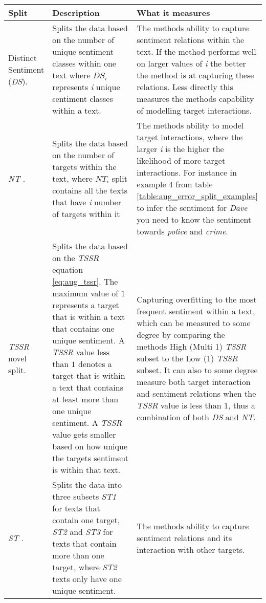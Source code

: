 \begin{longtable}{|p{0.15\linewidth}|p{0.45\linewidth}|p{0.4\linewidth}|}
\hline
Split & Description & What it measures \\
\hline
Distinct Sentiment (\textit{DS})\citep{wang-etal-2017-tdparse}. & Splits the data based on the number of unique sentiment classes within one text where $DS_i$ represents \textit{i} unique sentiment classes within a text. &  The methods ability to capture sentiment relations within the text. If the method performs well on larger values of \textit{i} the better the method is at capturing these relations. Less directly this measures the methods capability of modelling target interactions. \\
\hline
\textit{NT} \citep{zhang-etal-2019-aspect}. & Splits the data based on the number of targets within the text, where $NT_i$ split contains all the texts that have \textit{i} number of targets within it & The methods ability to model target interactions, where the larger \textit{i} is the higher the likelihood of more target interactions. For instance in example 4 from table \ref{table:aug_error_split_examples} to infer the sentiment for \textit{Dave} you need to know the sentiment towards \textit{police} and \textit{crime}.\\
\hline
\textit{TSSR} novel split. & Splits the data based on the \textit{TSSR} equation \ref{eq:aug_tssr}. The maximum value of $1$ represents a target that is within a text that contains one unique sentiment. A \textit{TSSR} value less than $1$ denotes a target that is within a text that contains at least more than one unique sentiment. A \textit{TSSR} value gets smaller based on how unique the targets sentiment is within that text. & Capturing overfitting to the most frequent sentiment within a text, which can be measured to some degree by comparing the methods High (Multi 1) \textit{TSSR} subset to the Low (1) \textit{TSSR} subset. It can also to some degree measure both target interaction and sentiment relations when the \textit{TSSR} value is less than $1$, thus a combination of both \textit{DS} and \textit{NT}.\\
\hline
\textit{ST} \citep{nguyen-shirai-2015-phrasernn}. & Splits the data into three subsets \textit{ST1} for texts that contain one target, \textit{ST2} and \textit{ST3} for texts that contain more than one target, where \textit{ST2} texts only have one unique sentiment. & The methods ability to capture sentiment relations and its interaction with other targets. \\

\end{longtable}
